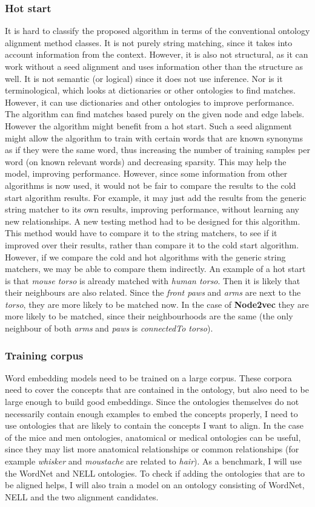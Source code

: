 \documentclass{article}
\begin{document}
  \subsubsection{Hot start}
  It is hard to classify the proposed algorithm in terms of the conventional ontology alignment method classes. It is not purely string matching, since it takes into account information from the context. However, it is also not structural, as it can work without a seed alignment and uses information other than the structure as well. It is not semantic (or logical) since it does not use inference. Nor is it terminological, which looks at dictionaries or other ontologies to find matches. However, it can use dictionaries and other ontologies to improve performance.
  The algorithm can find matches based purely on the given node and edge labels. However the algorithm might benefit from a hot start. Such a seed alignment might allow the algorithm to train with certain words that are known synonyms as if they were the same word, thus increasing the number of training samples per word (on known relevant words) and decreasing sparsity. This may help the model, improving performance. However, since some information from other algorithms is now used, it would not be fair to compare the results to the cold start algorithm results. For example, it may just add the results from the generic string matcher to its own results, improving performance, without learning any new relationships. A new testing method had to be designed for this algorithm. This method would have to compare it to the string matchers, to see if it improved over their results, rather than compare it to the cold start algorithm. However, if we compare the cold and hot algorithms with the generic string matchers, we may be able to compare them indirectly.
  An example of a hot start is that \emph{mouse torso} is already matched with \emph{human torso}. Then it is likely that their neighbours are also related. Since the \emph{front paws} and \emph{arms} are next to the \emph{torso}, they are more likely to be matched now. In the case of \textbf{Node2vec} they are more likely to be matched, since their neighbourhoods are the same (the only neighbour of both \emph{arms} and \emph{paws} is \emph{connectedTo torso}).
 \subsubsection{Training corpus}
  Word embedding models need to be trained on a large corpus. These corpora need to cover the concepts that are contained in the ontology, but also need to be large enough to build good embeddings. Since the ontologies themselves do not necessarily contain enough examples to embed the concepts properly, I need to use ontologies that are likely to contain the concepts I want to align. In the case of the mice and men ontologies, anatomical or medical ontologies can be useful, since they may list more anatomical relationships or common relationships (for example \emph{whisker} and \emph{moustache} are related to \emph{hair}).
  As a benchmark, I will use the WordNet and NELL ontologies. To check if adding the ontologies that are to be aligned helps, I will also train a model on an ontology consisting of WordNet, NELL and the two alignment candidates.
\end{document}
